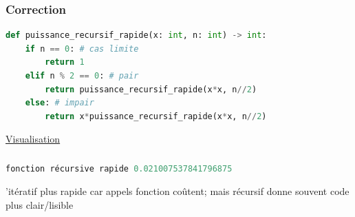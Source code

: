 \documentclass[svgnames,11pt]{beamer}
\begin{document}
\begin{frame}[fragile]
    \frametitle{Correction}

\begin{center}
\begin{lstlisting}[language=Python , basicstyle=\ttfamily\small, xleftmargin=0.5em, xrightmargin=0.5em]
def puissance_recursif_rapide(x: int, n: int) -> int:
    if n == 0: # cas limite
        return 1
    elif n % 2 == 0: # pair
        return puissance_recursif_rapide(x*x, n//2)
    else: # impair
        return x*puissance_recursif_rapide(x*x, n//2)
\end{lstlisting}
\label{CODE}
\end{center}
\begin{center}
    \href{https://pythontutor.com/visualize.html#code=def%20puissance_recursif_rapide%28x,%20n%29%3A%0A%20%20%20%20if%20n%20%3D%3D%200%3A%0A%20%20%20%20%20%20%20%20return%201%0A%20%20%20%20elif%20n%20%25%202%20%3D%3D%200%3A%0A%20%20%20%20%20%20%20%20return%20puissance_recursif_rapide%28x*x,%20n//2%29%0A%20%20%20%20else%3A%0A%20%20%20%20%20%20%20%20return%20x*puissance_recursif_rapide%28x*x,%20n//2%29%0A%0Apuissance_recursif_rapide%283,%205%29&cumulative=false&curInstr=0&heapPrimitives=nevernest&mode=display&origin=opt-frontend.js&py=3&rawInputLstJSON=%5B%5D&textReferences=false}{Visualisation}
\end{center}
\end{frame}
\begin{frame}[fragile]
    \frametitle{}

    \begin{center}
        \begin{lstlisting}[language=Python , basicstyle=\ttfamily\small, xleftmargin=2em, xrightmargin=2em]
fonction récursive rapide 0.021007537841796875
\end{lstlisting}
        \label{CODE}
        \end{center}
\note[item]'itératif plus rapide car appels fonction coûtent; mais récursif donne souvent code plus clair/lisible
\end{frame}
\end{document}
